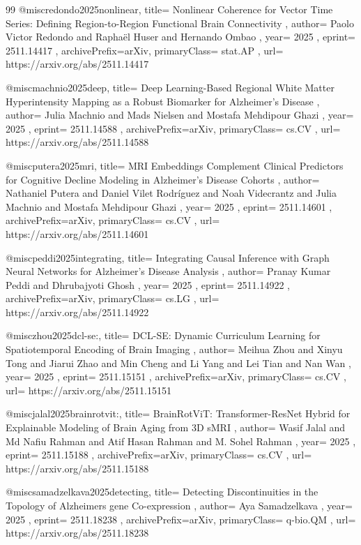 \documentclass[11pt,a4paper]{article}
\begin{document}
\begin{thebibliography}{99}
@misc{redondo2025nonlinear,
  title={ Nonlinear Coherence for Vector Time Series: Defining Region-to-Region Functional Brain Connectivity },
  author={ Paolo Victor Redondo and Raphaël Huser and Hernando Ombao },
  year={ 2025 },
  eprint={ 2511.14417 },
  archivePrefix={arXiv},
  primaryClass={ stat.AP },
  url={ https://arxiv.org/abs/2511.14417 }
}


@misc{machnio2025deep,
  title={ Deep Learning-Based Regional White Matter Hyperintensity Mapping as a Robust Biomarker for Alzheimer's Disease },
  author={ Julia Machnio and Mads Nielsen and Mostafa Mehdipour Ghazi },
  year={ 2025 },
  eprint={ 2511.14588 },
  archivePrefix={arXiv},
  primaryClass={ cs.CV },
  url={ https://arxiv.org/abs/2511.14588 }
}


@misc{putera2025mri,
  title={ MRI Embeddings Complement Clinical Predictors for Cognitive Decline Modeling in Alzheimer's Disease Cohorts },
  author={ Nathaniel Putera and Daniel Vilet Rodríguez and Noah Videcrantz and Julia Machnio and Mostafa Mehdipour Ghazi },
  year={ 2025 },
  eprint={ 2511.14601 },
  archivePrefix={arXiv},
  primaryClass={ cs.CV },
  url={ https://arxiv.org/abs/2511.14601 }
}


@misc{peddi2025integrating,
  title={ Integrating Causal Inference with Graph Neural Networks for Alzheimer's Disease Analysis },
  author={ Pranay Kumar Peddi and Dhrubajyoti Ghosh },
  year={ 2025 },
  eprint={ 2511.14922 },
  archivePrefix={arXiv},
  primaryClass={ cs.LG },
  url={ https://arxiv.org/abs/2511.14922 }
}


@misc{zhou2025dcl-se:,
  title={ DCL-SE: Dynamic Curriculum Learning for Spatiotemporal Encoding of Brain Imaging },
  author={ Meihua Zhou and Xinyu Tong and Jiarui Zhao and Min Cheng and Li Yang and Lei Tian and Nan Wan },
  year={ 2025 },
  eprint={ 2511.15151 },
  archivePrefix={arXiv},
  primaryClass={ cs.CV },
  url={ https://arxiv.org/abs/2511.15151 }
}


@misc{jalal2025brainrotvit:,
  title={ BrainRotViT: Transformer-ResNet Hybrid for Explainable Modeling of Brain Aging from 3D sMRI },
  author={ Wasif Jalal and Md Nafiu Rahman and Atif Hasan Rahman and M. Sohel Rahman },
  year={ 2025 },
  eprint={ 2511.15188 },
  archivePrefix={arXiv},
  primaryClass={ cs.CV },
  url={ https://arxiv.org/abs/2511.15188 }
}


@misc{samadzelkava2025detecting,
  title={ Detecting Discontinuities in the Topology of Alzheimers gene Co-expression },
  author={ Aya Samadzelkava },
  year={ 2025 },
  eprint={ 2511.18238 },
  archivePrefix={arXiv},
  primaryClass={ q-bio.QM },
  url={ https://arxiv.org/abs/2511.18238 }
}



\end{thebibliography}
\end{document}

